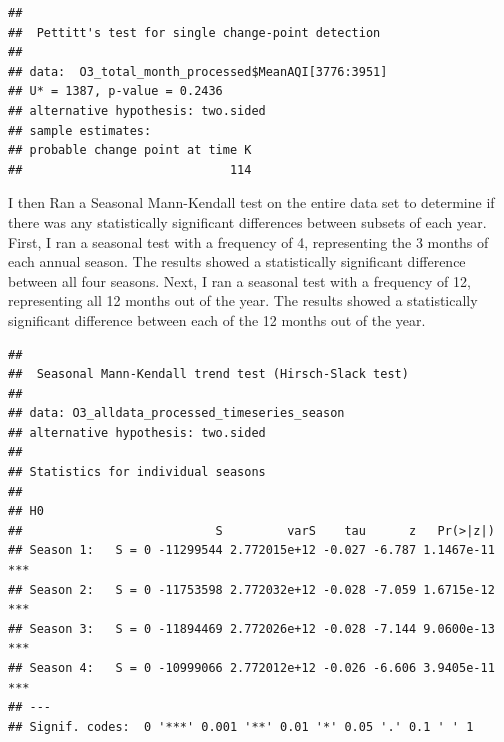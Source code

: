 \documentclass[12pt,]{article}
\newenvironment{Shaded}{\begin{snugshade}}{\end{snugshade}}
\newcommand{\KeywordTok}[1]{\textcolor[rgb]{0.13,0.29,0.53}{\textbf{#1}}}
\newcommand{\DataTypeTok}[1]{\textcolor[rgb]{0.13,0.29,0.53}{#1}}
\newcommand{\DecValTok}[1]{\textcolor[rgb]{0.00,0.00,0.81}{#1}}
\newcommand{\StringTok}[1]{\textcolor[rgb]{0.31,0.60,0.02}{#1}}
\newcommand{\CommentTok}[1]{\textcolor[rgb]{0.56,0.35,0.01}{\textit{#1}}}
\newcommand{\OperatorTok}[1]{\textcolor[rgb]{0.81,0.36,0.00}{\textbf{#1}}}
\newcommand{\NormalTok}[1]{#1}
\begin{document}
\begin{Shaded}
\end{Shaded}

\begin{verbatim}
## 
##  Pettitt's test for single change-point detection
## 
## data:  O3_total_month_processed$MeanAQI[3776:3951]
## U* = 1387, p-value = 0.2436
## alternative hypothesis: two.sided
## sample estimates:
## probable change point at time K 
##                             114
\end{verbatim}

I then Ran a Seasonal Mann-Kendall test on the entire data set to
determine if there was any statistically significant differences between
subsets of each year. First, I ran a seasonal test with a frequency of
4, representing the 3 months of each annual season. The results showed a
statistically significant difference between all four seasons. Next, I
ran a seasonal test with a frequency of 12, representing all 12 months
out of the year. The results showed a statistically significant
difference between each of the 12 months out of the year.

\begin{Shaded}
\end{Shaded}

\begin{verbatim}
## 
##  Seasonal Mann-Kendall trend test (Hirsch-Slack test)
## 
## data: O3_alldata_processed_timeseries_season
## alternative hypothesis: two.sided
## 
## Statistics for individual seasons
## 
## H0
##                           S         varS    tau      z   Pr(>|z|)    
## Season 1:   S = 0 -11299544 2.772015e+12 -0.027 -6.787 1.1467e-11 ***
## Season 2:   S = 0 -11753598 2.772032e+12 -0.028 -7.059 1.6715e-12 ***
## Season 3:   S = 0 -11894469 2.772026e+12 -0.028 -7.144 9.0600e-13 ***
## Season 4:   S = 0 -10999066 2.772012e+12 -0.026 -6.606 3.9405e-11 ***
## ---
## Signif. codes:  0 '***' 0.001 '**' 0.01 '*' 0.05 '.' 0.1 ' ' 1
\end{verbatim}
\end{document}
